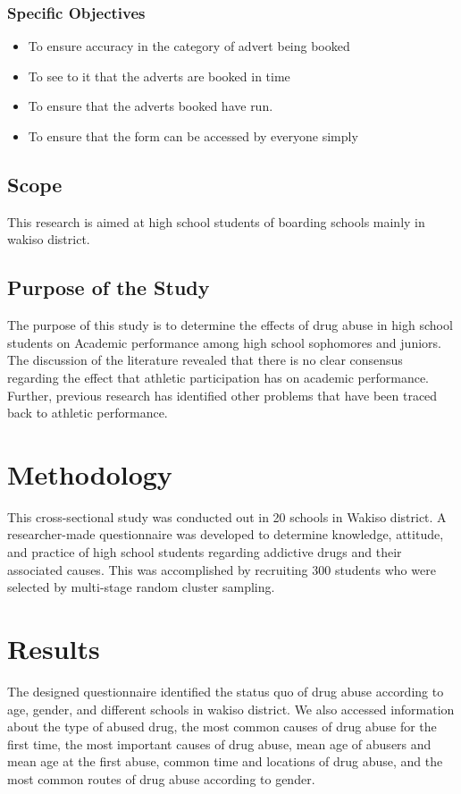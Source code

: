 \documentclass[options]{article}
\begin{document}
\subsubsection{\textbf{Specific Objectives}}

\begin{itemize}
\item To ensure accuracy in the category of advert being booked
\item To see to it that the adverts are booked in time
  \item To ensure that the adverts booked have run.
  \item To ensure that the form can be accessed by everyone simply
\end{itemize}


\subsection{\textbf{Scope}}
This research is aimed at high school students of boarding schools mainly in wakiso district.

\subsection{\textbf{Purpose of the Study}}
The purpose of this study is to determine the effects of drug abuse in high school students on
Academic performance among high school sophomores and juniors. The discussion of the literature revealed that there is no clear consensus regarding the effect that athletic participation has on academic performance. Further, previous research has identified other problems that have been traced back to athletic performance.


\section{\textbf{Methodology}}
This cross-sectional study was conducted out in 20  schools in Wakiso district. A researcher-made questionnaire was developed to determine knowledge, attitude, and practice of high school students regarding addictive drugs and their associated causes. This was accomplished by recruiting 300 students who were selected by multi-stage random cluster sampling.

\section{\textbf{Results}}
The designed questionnaire identified the status quo of drug abuse according to age, gender, and different schools in wakiso district. We also accessed information about the type of abused drug, the most common causes of drug abuse for the first time, the most important causes of drug abuse, mean age of abusers and mean age at the first abuse, common time and locations of drug abuse, and the most common routes of drug abuse according to gender.
\end{document}
